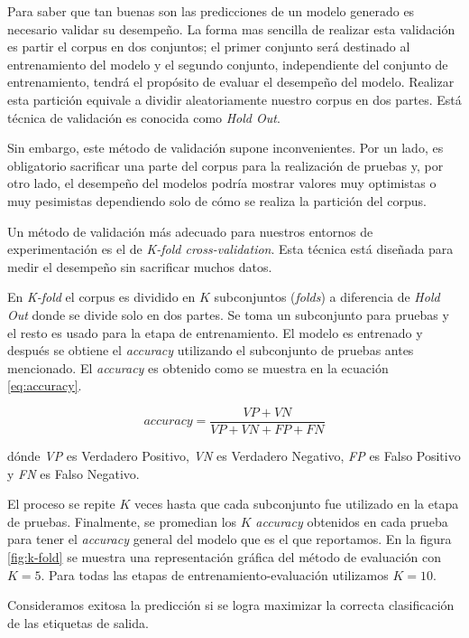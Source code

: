 \documentclass[letterpaper,12pt,oneside]{book}
\theoremstyle{definition}
\begin{document}
Para saber que tan buenas son las predicciones de un modelo generado es necesario validar su desempeño. La forma mas sencilla de realizar esta validación es partir el corpus en dos conjuntos; el primer conjunto será destinado al entrenamiento del modelo y el segundo conjunto, independiente del conjunto de entrenamiento, tendrá el propósito de evaluar el desempeño del modelo. Realizar esta partición equivale a dividir aleatoriamente nuestro corpus en dos partes. Está técnica de validación es conocida como \textit{Hold Out}.

Sin embargo, este método de validación supone inconvenientes. Por un lado, es obligatorio sacrificar una parte del corpus para la realización de pruebas y, por otro lado, el desempeño del modelos podría mostrar valores muy optimistas o muy pesimistas dependiendo solo de cómo se realiza la partición del corpus.

Un método de validación más adecuado para nuestros entornos de experimentación es el de \textit{K-fold cross-validation}. Esta técnica está diseñada para medir el desempeño sin sacrificar muchos datos. 

En \textit{K-fold} el corpus es dividido en $K$ subconjuntos (\textit{folds}) a diferencia de \textit{Hold Out} donde se divide solo en dos partes. Se toma un subconjunto para pruebas y el resto es usado para la etapa de entrenamiento. El modelo es entrenado y después se obtiene el \textit{accuracy} utilizando el subconjunto de pruebas antes mencionado. El \textit{accuracy} es obtenido como se muestra en la ecuación \ref{eq:accuracy}.

\begin{equation}\label{eq:accuracy}
    accuracy = \frac{VP + VN}{VP + VN + FP + FN}
\end{equation}

dónde \textit{VP} es Verdadero Positivo, \textit{VN} es Verdadero Negativo, \textit{FP} es Falso Positivo y \textit{FN} es Falso Negativo.

El proceso se repite $K$ veces hasta que cada subconjunto fue utilizado en la etapa de pruebas. Finalmente, se promedian los $K$ \textit{accuracy} obtenidos en cada prueba para tener el \textit{accuracy} general del modelo que es el que reportamos. En la figura \ref{fig:k-fold} se muestra una representación gráfica del método de evaluación con $K = 5$. Para todas las etapas de entrenamiento-evaluación utilizamos $K = 10$.

Consideramos exitosa la predicción si se logra maximizar la correcta clasificación de las etiquetas de salida.
\end{document}

